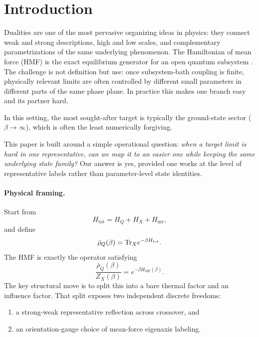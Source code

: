 \section{Introduction}
\label{sec:introduction}

Dualities are one of the most pervasive organizing ideas in physics: they connect weak and strong
descriptions, high and low scales, and complementary parametrizations of the same underlying
phenomenon.
The Hamiltonian of mean force (HMF) is the exact equilibrium generator for an open quantum subsystem
\cite{gelinThermodynamicsSubensembleCanonical2009a,hiltHamiltonianMeanForce2011,talknerColloquiumStatisticalMechanics2020,rivasStrongCouplingThermodynamics2020,burkeStructureHamiltonianMean2024}.
The challenge is not definition but use: once subsystem-bath coupling is finite, physically relevant
limits are often controlled by different small parameters in different parts of the same phase plane.
In practice this makes one branch easy and its partner hard.

In this setting, the most sought-after target is typically the ground-state sector (\(\beta\to\infty\)),
which is often the least numerically forgiving.

This paper is built around a simple operational question:
\emph{when a target limit is hard in one representative, can we map it to an easier one while
keeping the same underlying state family?}
Our answer is yes, provided one works at the level of representative labels rather than
parameter-level state identities.

\paragraph{Physical framing.}
Start from
\begin{equation}
  H_{\mathrm{tot}}=H_Q+H_X+H_{\mathrm{int}},
\end{equation}
and define
\begin{equation}
  \bar{\rho}_Q(\beta)=\mathrm{Tr}_X e^{-\beta H_{\mathrm{tot}}}.
\end{equation}
The HMF is exactly the operator satisfying
\begin{equation}
  \frac{\bar{\rho}_Q(\beta)}{Z_X(\beta)}=e^{-\beta H_{\mathrm{MF}}(\beta)}.
\end{equation}
The key structural move is to split this into a bare thermal factor and an influence factor.
That split exposes two independent discrete freedoms:
\begin{enumerate}
  \item a strong-weak representative reflection across crossover, and
  \item an orientation-gauge choice of mean-force eigenaxis labeling.
\end{enumerate}

